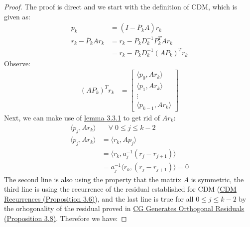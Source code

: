 \documentclass[]{article}
\theoremstyle{definition}
\begin{document}
            \begin{proof}
                The proof is direct and we start with the definition of CDM, which is given as: 
                \begin{align}
                    p_k &= (I - \overline{P}_kA)r_k
                    \\
                    r_k - \overline{P}_kAr_k &= 
                    r_k - P_kD^{-1}_kP^T_kAr_k
                    \\
                    &= r_k - P_kD^{-1}_k(AP_k)^Tr_k
                \end{align}
                Observe:
                \begin{align}
                    (AP_k)^Tr_k &= 
                    \begin{bmatrix}
                        \langle p_0, Ar_k\rangle
                        \\
                        \langle p_1, Ar_k\rangle
                        \\
                        \vdots
                        \\
                        \langle p_{k - 1}, Ar_k\rangle
                    \end{bmatrix}
                \end{align}
                Next, we can make use of \hyperref[lemma:CG_Lemma_1]{lemma 3.3.1} to get rid of $Ar_k$: 
                \begin{align}
                    \langle p_j, Ar_k\rangle& \quad \forall\; 0 \le j \le k -2 
                    \\
                    \langle p_j, Ar_k\rangle&= \langle r_k, Ap_j\rangle
                    \\
                    &= \langle r_k, a_j^{-1}(r_j - r_{j + 1})\rangle
                    \\
                    &= a_j^{-1}\langle r_k, (r_j - r_{j + 1})\rangle = 0
                \end{align}
                The second line is also using the property that the matrix $A$ is symmetric, the third line is using the recurrence of the residual established for CDM (\hyperref[prop:CDM_Recurrence]{CDM Recurrences (Proposition 3.6)}), and the last line is true for all $0 \le j \le k - 2$ by the orhogonality of the residual proved in \hyperref[prop:CG_Generates_Orthogonal_Residuals]{CG Generates Orthogonal Residuals (Proposition 3.8)}. Therefore we have: 
                

\end{proof}
\end{document}
